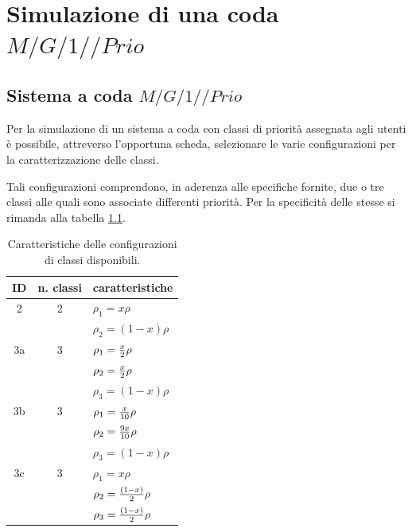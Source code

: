 \chapter{Simulazione di una coda $M/G/1//Prio$}

\section{Sistema a coda $M/G/1//Prio$}


Per la simulazione di un sistema a coda con classi di priorit\`a assegnata agli utenti \`e possibile, attreverso l'opportuna scheda, selezionare le varie configurazioni per la caratterizzazione delle classi.

Tali configurazioni comprendono, in aderenza alle specifiche fornite, due o tre classi alle quali sono associate differenti priorit\`a. Per la specificit\`a delle stesse si rimanda alla tabella \ref{tab:mg1prioclasses}.

\begin{table}[!h]
	\begin{center}
	\begin{tabular}{|ccl|}
	\hline
	ID  & n. classi & caratteristiche\\
	\hline
	2 & 2 & $\rho_{1}=x\rho$  \\
	& & $\rho_{2}=(1-x)\rho$ \\
	\hline
	3a & 3 & $\rho_{1}={x\over2}\rho$  \\
	& & $\rho_{2}={x\over2}\rho$  \\
	& & $\rho_{3}=(1-x)\rho$  \\
	\hline
	3b & 3 & $\rho_{1}={x\over10}\rho$ \\
	& & $\rho_{2}={9x\over10}\rho$  \\
	& & $\rho_{3}=(1-x)\rho$  \\
	\hline
	3c & 3 & $\rho_{1}=x\rho$ \\
	& & $\rho_{2}={(1-x)\over2}\rho$  \\
	& & $\rho_{3}={(1-x)\over2}\rho$  \\
	\hline
	\end{tabular}
	\end{center}
	\caption{Caratteristiche delle configurazioni di classi disponibili.}
	\label{tab:mg1prioclasses}
\end{table}

